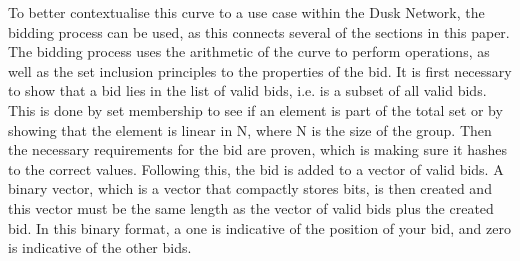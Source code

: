 \documentclass{article}
\begin{document}
To better contextualise this curve to a use case within the Dusk Network, the bidding process can be used, as this connects several of the sections in this paper. The bidding process uses the arithmetic of the curve to perform operations, as well as the set inclusion principles to the properties of the bid. It is first necessary to show that a bid lies in the list of valid bids, i.e. is a subset of all valid bids. This is done by set membership to see if an element is part of the total set or by showing that the element is linear in N, where N is the size of the group. Then the necessary requirements for the bid are proven, which is making sure it hashes to the correct values. Following this, the bid is added to a vector of valid bids. A binary vector, which is a vector that compactly stores bits, is then created and this vector must be the same length as the vector of valid bids plus the created bid. In this binary format, a one is indicative of the position of your bid, and zero is indicative of the other bids.
\end{document}

